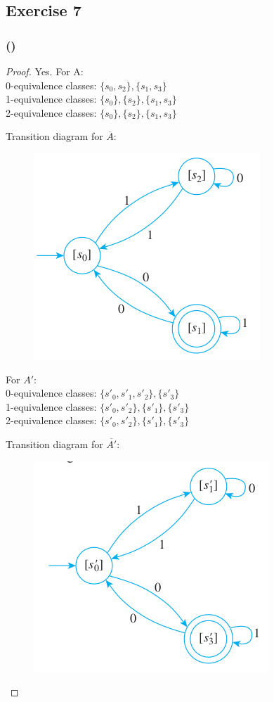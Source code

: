 \documentclass[14pt]{extarticle}
\begin{document}
\subsection{Exercise 7}

\subsubsection{()}

\begin{proof}
Yes. For A: \\
0-equivalence classes: \(\{s_0, s_2\}, \{s_1, s_3\}\) \\
1-equivalence classes: \(\{s_0\}, \{s_2\}, \{s_1, s_3\}\) \\
2-equivalence classes: \(\{s_0\}, \{s_2\}, \{s_1, s_3\}\)

Transition diagram for \(\overline{A}\):

\begin{figure}[ht!]
\centering
\includegraphics[scale=0.5]{../images/12.3.7.a.png}
\end{figure}

For \(A'\): \\
0-equivalence classes: \(\{s'_0, s'_1, s'_2\}, \{s'_3\}\) \\
1-equivalence classes: \(\{s'_0, s'_2\}, \{s'_1\}, \{s'_3\}\) \\
2-equivalence classes: \(\{s'_0, s'_2\}, \{s'_1\}, \{s'_3\}\)

Transition diagram for \(\overline{A'}\):

\begin{figure}[ht!]
\centering
\includegraphics[scale=0.5]{../images/12.3.7.b.png}
\end{figure}


\end{proof}
\end{document}
